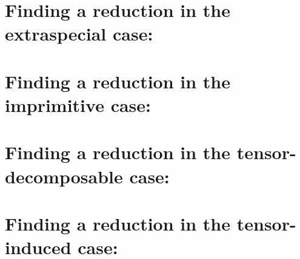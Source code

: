 \section{Finding a reduction in the extraspecial case: }
\label{solveC6}

\section{Finding a reduction in the imprimitive case: }
\label{solveC2}

\section{Finding a reduction in the tensor-decomposable case: }
\label{solveC4}

\section{Finding a reduction in the tensor-induced case: }
\label{solveC7}



